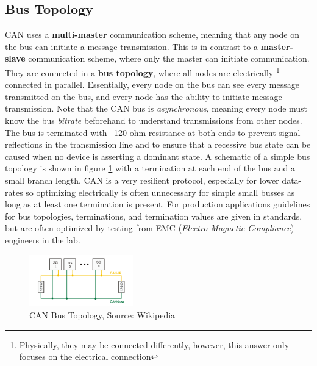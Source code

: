 \documentclass[main.tex]{subfiles}
\begin{document}
\subsection{Bus Topology}
CAN uses a \textbf{multi-master} communication scheme, meaning that any node on the bus can initiate a message transmission. This is in contrast to a \textbf{master-slave} communication scheme, where only the master can initiate communication. They are connected in a \textbf{bus topology}, where all nodes are electrically \footnote{Physically, they may be connected differently, however, this answer only focuses on the electrical connection} connected in parallel. Essentially, every node on the bus can see every message transmitted on the bus, and every node has the ability to initiate message transmission. Note that the CAN bus is \textit{asynchronous}, meaning every node must know the bus \textit{bitrate} beforehand to understand transmissions from other nodes.
\newline
\newnoindentpara
The bus is terminated with ~120 ohm resistance at both ends to prevent signal reflections in the transmission line and to ensure that a recessive bus state can be caused when no device is asserting a dominant state. A schematic of a simple bus topology is shown in figure \ref{fig:bus-topology} with a termination at each end of the bus and a small branch length. CAN is a very resilient protocol, especially for lower data-rates so optimizing electrically is often unnecessary for simple small busses as long as at least one termination is present. For production applications guidelines for bus topologies, terminations, and termination values are given in standards, but are often optimized by testing from EMC (\textit{Electro-Magnetic Compliance}) engineers in the lab.

\begin{figure}[H]
    \centering
    \includegraphics[width=0.4\textwidth]{images/wikipedia_can_bus_topology.png}
    \caption{CAN Bus Topology, Source: Wikipedia \cite{wikipedia_can_bus_image}}
    \label{fig:bus-topology}
\end{figure}
\end{document}
